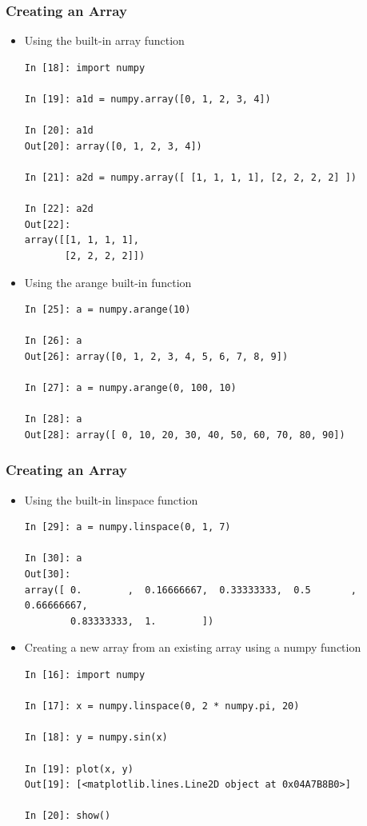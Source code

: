 \documentclass{beamer}
\begin{document}
\begin{frame}[fragile]
\frametitle{Creating an Array}
\begin{itemize}
  \item{Using the built-in array function}
  \begin{lstlisting}
In [18]: import numpy

In [19]: a1d = numpy.array([0, 1, 2, 3, 4])

In [20]: a1d
Out[20]: array([0, 1, 2, 3, 4])

In [21]: a2d = numpy.array([ [1, 1, 1, 1], [2, 2, 2, 2] ])

In [22]: a2d
Out[22]:
array([[1, 1, 1, 1],
       [2, 2, 2, 2]])
  \end{lstlisting}
  \item Using the arange built-in function
  \begin{lstlisting}
In [25]: a = numpy.arange(10)

In [26]: a
Out[26]: array([0, 1, 2, 3, 4, 5, 6, 7, 8, 9])

In [27]: a = numpy.arange(0, 100, 10)

In [28]: a
Out[28]: array([ 0, 10, 20, 30, 40, 50, 60, 70, 80, 90])
  \end{lstlisting}
\end{itemize}
\end{frame}

\begin{frame}[fragile]
\frametitle{Creating an Array}
\begin{itemize}
  \item{Using the built-in linspace function}
  \begin{lstlisting}
In [29]: a = numpy.linspace(0, 1, 7)

In [30]: a
Out[30]:
array([ 0.        ,  0.16666667,  0.33333333,  0.5       ,  0.66666667,
        0.83333333,  1.        ])
  \end{lstlisting}

  \item{Creating a new array from an existing array using a numpy function}
  \begin{lstlisting}
In [16]: import numpy

In [17]: x = numpy.linspace(0, 2 * numpy.pi, 20)

In [18]: y = numpy.sin(x)

In [19]: plot(x, y)
Out[19]: [<matplotlib.lines.Line2D object at 0x04A7B8B0>]

In [20]: show()
  \end{lstlisting}

\end{itemize}
\end{frame}
\end{document}
